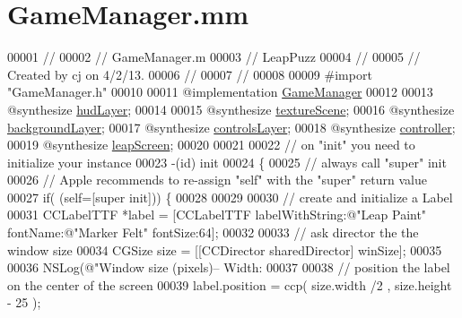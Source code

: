\hypertarget{_game_manager_8mm}{\section{Game\-Manager.\-mm}
\label{df/de3/_game_manager_8mm}
}

\begin{DoxyCode}
00001 \textcolor{comment}{//}
00002 \textcolor{comment}{//  GameManager.m}
00003 \textcolor{comment}{//  LeapPuzz}
00004 \textcolor{comment}{//}
00005 \textcolor{comment}{//  Created by cj on 4/2/13.}
00006 \textcolor{comment}{//}
00007 \textcolor{comment}{//}
00008 
00009 \textcolor{preprocessor}{#import "GameManager.h"}
00010 
00011 \textcolor{keyword}{@implementation }\hyperlink{interface_game_manager}{GameManager}
00012 
00013 \textcolor{keyword}{@synthesize} \hyperlink{interface_game_manager_ae286fb2f9d31810d73c7231a574b56b0}{hudLayer};
00014 
00015 \textcolor{keyword}{@synthesize} \hyperlink{interface_game_manager_a79a86ff991f39b3007d99ca61af21253}{textureScene};
00016 \textcolor{keyword}{@synthesize} \hyperlink{interface_game_manager_a2a3a96f1202b13592f244cf1402b4051}{backgroundLayer};
00017 \textcolor{keyword}{@synthesize} \hyperlink{interface_game_manager_a0ee5903be06e4a676ddde4c1f03530a7}{controlsLayer};
00018 \textcolor{keyword}{@synthesize} \hyperlink{interface_game_manager_a4b089253ae3569099d28535b128f3436}{controller};
00019 \textcolor{keyword}{@synthesize} \hyperlink{interface_game_manager_a85cb30e21c987f66855a762c6ba88096}{leapScreen};
00020 
00021 
00022 \textcolor{comment}{// on "init" you need to initialize your instance}
00023 -(id) init
00024 \{
00025     \textcolor{comment}{// always call "super" init}
00026     \textcolor{comment}{// Apple recommends to re-assign "self" with the "super" return value}
00027     \textcolor{keywordflow}{if}( (\textcolor{keyword}{self}=[super init])) \{
00028         
00029                 
00030         \textcolor{comment}{// create and initialize a Label}
00031         CCLabelTTF *label = [CCLabelTTF labelWithString:@"Leap Paint" fontName:@"Marker Felt" fontSize:64];
00032         
00033         \textcolor{comment}{// ask director the the window size}
00034         CGSize size = [[CCDirector sharedDirector] winSize];
00035         
00036         NSLog(\textcolor{stringliteral}{@"Window size (pixels)-- Width: %
00037         
00038         \textcolor{comment}{// position the label on the center of the screen}
00039         label.position =  ccp( size.width /2 , size.height - 25 );
}
\end{DoxyCode}

